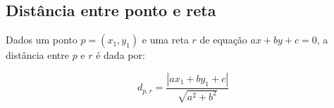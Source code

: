 \subsection{Distância entre ponto e reta}

Dados um ponto $p = (x_1,y_1)$ e uma reta $r$ de equação $ax+by+c=0$, a distância entre $p$ e $r$ é dada por:

\[
d_{p,r} = \frac{|ax_1 + by_1 + c|}{\sqrt{a^2 + b^2}}
\]
